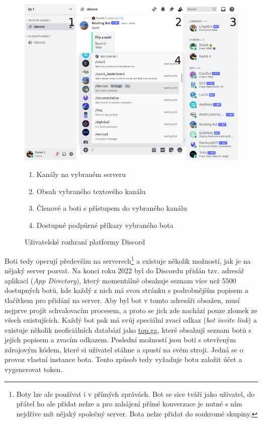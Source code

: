 \documentclass[FM]{tulthesis}
\begin{document}
	\begin{figure}[ht]
		\centering
		\includegraphics[width=\textwidth]{img/DiscordBotCommands}
		\begin{enumerate}[nolistsep]
			\item Kanály na vybraném serveru
			\item Obsah vybraného textového kanálu
			\item Členové a boti s přístupem do vybraného kanálu
			\item Dostupné podpůrné příkazy vybraného bota
		\end{enumerate}
		\caption{Uživatelské rozhraní platformy Discord}		
	\end{figure}
	
	Boti tedy operují především na serverech\footnote{Boty lze ale používat i v přímých zprávách. Bot se sice tváří jako uživatel, do přátel ho ale přidat nelze a pro zahájení přímé konverzace je nutné s ním nejdříve mít nějaký společný server. Bota nelze přidat do soukromé skupiny.} a existuje několik možností, jak je na nějaký server pozvat. Na konci roku 2022 byl do Discordu přidán tzv. adresář aplikací (\textit{App Directory}), který momentálně obsahuje seznam více než 5500 dostupných botů, kde každý z nich má svou stránku s podrobnějším popisem a tlačítkem pro přidání na server. Aby byl bot v tomto adresáři obsažen, musí nejprve projít schvalovacím procesem, a proto se jich zde nachází pouze zlomek ze všech existujících. Každý bot pak má svůj speciální zvací odkaz (\textit{bot invite link}) a existuje několik neoficiálních databází jako \href{https://top.gg}{top.gg}, které obsahují seznam botů s jejich popisem a zvacím odkazem. Poslední možností jsou boti s otevřeným zdrojovým kódem, které si uživatel stáhne a spustí na svém stroji. Jedná se o provoz vlastní instance bota. Tento způsob tedy vyžaduje botu založit účet a vygenerovat token.
	
\end{document}

